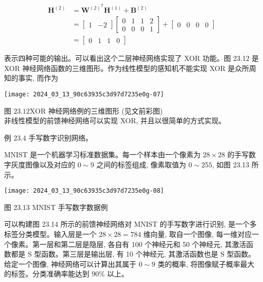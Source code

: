 \documentclass[10pt]{article}
\begin{document}
\begin{CJK*}{UTF8}{bsmi}
$$
\begin{aligned}
\boldsymbol{H}^{(2)} & =\boldsymbol{W}^{(2)^{\mathrm{T}}} \boldsymbol{H}^{(1)}+\boldsymbol{B}^{(2)} \\
& =\left[\begin{array}{cc}
1 & -2
\end{array}\right]\left[\begin{array}{llll}
0 & 1 & 1 & 2 \\
0 & 0 & 0 & 1
\end{array}\right]+\left[\begin{array}{llll}
0 & 0 & 0 & 0
\end{array}\right] \\
& =\left[\begin{array}{llll}
0 & 1 & 1 & 0
\end{array}\right]
\end{aligned}
$$

表示四种可能的输出。可以看出这个二层神经网络实现了 XOR 功能。图 23.12 是 XOR 神经网络函数的三维图形。作为线性模型的感知机不能实现 XOR 是众所周知的事实, 而作为

\begin{center}
\texttt{[image: 2024\_03\_13\_90c63935c3d97d7235e0g-07]}
\end{center}

图 $23.12 \mathrm{XOR}$ 神经网络例的三维图形 (见文前彩图)\\
非线性模型的前馈神经网络可以实现 XOR, 并且以很简单的方式实现。

例 23.4 手写数字识别网络。

MNIST 是一个机器学习标准数据集。每一个样本由一个像素为 $28 \times 28$ 的手写数字灰度图像以及对应的 $0 \sim 9$ 之间的标签组成, 像素取值为 $0 \sim 255$, 如图 23.13 所示。

\begin{center}
\texttt{[image: 2024\_03\_13\_90c63935c3d97d7235e0g-08]}
\end{center}

图 23.13 MNIST 手写数字数据例

可以构建图 23.14 所示的前馈神经网络对 MNIST 的手写数字进行识别, 是一个多标签分类模型。输入层是一个 $28 \times 28=784$ 维向量, 取自一个图像, 每一维对应一个像素。第一层和第二层是隐层, 各自有 100 个神经元和 50 个神经元, 其激活函数都是 $\mathrm{S}$ 型函数。第三层是输出层, 有 10 个神经元, 其激活函数也是 $\mathrm{S}$ 型函数。给定一个图像, 神经网络可以计算出其属于 $0 \sim 9$ 类的概率, 将图像赋子概率最大的标签。分类准确率能达到 $90 \%$ 以上。


\end{CJK*}
\end{document}
